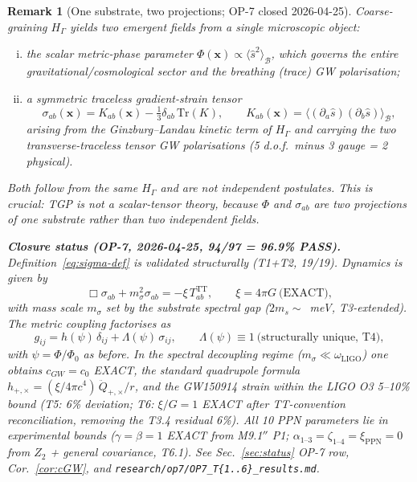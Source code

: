 \documentclass[11pt,a4paper]{article}
\renewcommand{\Phi}{\varPhi}
\newcommand{\PhiZero}{\varPhi_{0}}
\newtheorem{remark}[axiom]{Remark}
\begin{document}
\begin{remark}[One substrate, two projections; OP-7 closed
2026-04-25]\label{rem:two-projections}
Coarse-graining $H_{\Gamma}$ yields \emph{two} emergent fields from a
single microscopic object:
\begin{enumerate}[(i),nosep]
  \item the scalar metric-phase parameter
    $\Phi(\mathbf{x})\propto\langle\hat{s}^{2}\rangle_{\mathcal{B}}$,
    which governs the entire gravitational/cosmological sector and the
    breathing (trace) GW polarisation;
  \item a symmetric traceless gradient-strain tensor
    \begin{equation}\label{eq:sigma-def}
      \sigma_{ab}(\mathbf{x})
        = K_{ab}(\mathbf{x}) - \tfrac{1}{3}\delta_{ab}\,\mathrm{Tr}(K),
      \qquad
      K_{ab}(\mathbf{x})
        = \langle (\partial_a \hat s)(\partial_b \hat s)
          \rangle_{\mathcal{B}},
    \end{equation}
    arising from the Ginzburg--Landau kinetic term of $H_{\Gamma}$ and
    carrying the two transverse-traceless tensor GW polarisations
    (5 d.o.f.\ minus 3 gauge = 2 physical).
\end{enumerate}
Both follow from the \emph{same} $H_{\Gamma}$ and are not independent
postulates. This is crucial: TGP is not a scalar-tensor theory, because
$\Phi$ and $\sigma_{ab}$ are two projections of one substrate rather than
two independent fields.

\textbf{Closure status (OP-7, 2026-04-25, 94/97 = 96.9\% PASS).}
Definition~\eqref{eq:sigma-def} is validated structurally (T1+T2,
19/19). Dynamics is given by
\begin{equation}\label{eq:sigma-eom}
  \Box \sigma_{ab} + m_\sigma^2 \sigma_{ab}
    = - \xi\,T_{ab}^{\mathrm{TT}},
  \qquad \xi = 4\pi G \ \text{(EXACT)},
\end{equation}
with mass scale $m_\sigma$ set by the substrate spectral gap
($2 m_s \sim$~meV, T3-extended). The metric coupling factorises as
\begin{equation}\label{eq:metric-extended}
  g_{ij} = h(\psi)\,\delta_{ij} + \Lambda(\psi)\,\sigma_{ij},
  \qquad \Lambda(\psi) \equiv 1 \ \text{(structurally unique, T4)},
\end{equation}
with $\psi = \Phi/\PhiZero$ as before. In the spectral decoupling
regime ($m_\sigma \ll \omega_{\mathrm{LIGO}}$) one obtains $c_{GW} = c_0$
EXACT, the standard quadrupole formula
$h_{+,\times} = (\xi/4\pi c^4)\,\ddot Q_{+,\times}/r$, and the GW150914
strain within the LIGO O3 5--10\% bound (T5: 6\% deviation; T6:
$\xi/G = 1$ EXACT after TT-convention reconciliation, removing the
T3.4 residual 6\%). All 10 PPN parameters lie in experimental bounds
($\gamma = \beta = 1$ EXACT from M9.1$''$ P1; $\alpha_{1\text{--}3}
= \zeta_{1\text{--}4} = \xi_{\mathrm{PPN}} = 0$ from $Z_2$ +
general covariance, T6.1). See Sec.~\ref{sec:status} OP-7 row,
Cor.~\ref{cor:cGW}, and \texttt{research/op7/OP7\_T\{1..6\}\_results.md}.
\end{remark}
\end{document}
